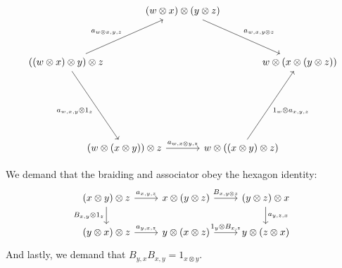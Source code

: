 \documentclass[TFM.tex]{subfiles}
\begin{document}
\begin{defi}
\[
\begin{tikzcd}[column sep=-25, row sep=35]
                                                                                                            &                                                                     & (w\otimes x)\otimes (y\otimes z) \arrow[rrd, "{a_{w,x,y\otimes z}}"] &                                                                         &                                \\
((w\otimes x)\otimes y)\otimes z \arrow[rru, "{a_{w\otimes x,y,z}}"] \arrow[rdd, "{a_{w,x,y}\otimes 1_z}"'] &                                                                     &                                                                      &                                                                         & w\otimes(x\otimes(y\otimes z)) \\
                                                                                                            &                                                                     &                                                                      &                                                                         &                                \\
                                                                                                            & (w\otimes (x\otimes y))\otimes z \arrow[rr, "{a_{w,x\otimes y,z}}"] &                                                                      & w\otimes ((x\otimes y)\otimes z) \arrow[ruu, "{1_w\otimes a_{x,y,z}}"'] &                               
\end{tikzcd}
\]


We demand that the braiding and associator obey the hexagon identity:
\[
\begin{tikzcd}
(x\otimes y)\otimes z \arrow[r, "{a_{x,y,z}}"] \arrow[d, "{B_{x,y}\otimes 1_z}"'] & x\otimes (y\otimes z) \arrow[r, "{B_{x,y\otimes z}}"]   & (y\otimes z)\otimes x \arrow[d, "{a_{y,z,x}}"] \\
(y\otimes x)\otimes z \arrow[r, "{a_{y,x,z}}"]                                    & y\otimes (x\otimes z) \arrow[r, "{1_y\otimes B_{x,z}}"] & y\otimes (z\otimes x)                         
\end{tikzcd}
\]
And lastly, we demand that $B_{y,x}B_{x,y}=1_{x\otimes y}$.
\end{defi}
\end{document}
